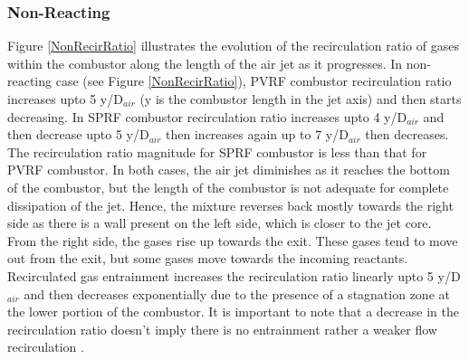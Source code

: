 \subsubsection{Non-Reacting}
Figure \ref{NonRecirRatio} illustrates the evolution of the recirculation ratio of gases within the combustor along the length of the air jet as it progresses.
In non-reacting case (see Figure \ref{NonRecirRatio}), PVRF combustor recirculation ratio increases upto 5 y/D$_{air}$ (y is the combustor length in the jet axis) and then starts decreasing. In SPRF combustor recirculation ratio increases upto 4 y/D$_{air}$ and then decrease upto 5 y/D$_{air}$ then increases again up to 7 y/D$_{air}$ then decreases. The recirculation ratio magnitude for SPRF combustor is less than that for PVRF combustor. In both cases, the air jet diminishes as it reaches the bottom of the combustor, but the length of the combustor is not adequate for complete dissipation of the jet. Hence, the mixture reverses back mostly towards the right side as there is a wall present on the left side, which is closer to the jet core. From the right side, the gases rise up towards the exit. These gases tend to move out from the exit, but some gases move towards the incoming reactants. Recirculated gas entrainment increases the recirculation ratio linearly upto 5 y/D$_{air}$ and then decreases exponentially due to the presence of a stagnation zone at the lower portion of the combustor. It is important to note that a decrease in the recirculation ratio doesn’t imply there is no entrainment rather a weaker flow recirculation .
